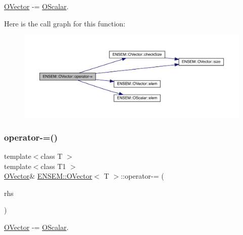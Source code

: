 \mbox{\hyperlink{classENSEM_1_1OVector}{O\+Vector}} -\/= \mbox{\hyperlink{classENSEM_1_1OScalar}{O\+Scalar}}. 

Here is the call graph for this function\+:
\nopagebreak
\begin{figure}[H]
\begin{center}
\leavevmode
\includegraphics[width=350pt]{d0/d8d/classENSEM_1_1OVector_ae2ae62360c5eb29827cb7e3d5556859f_cgraph}
\end{center}
\end{figure}
\mbox{\label{classENSEM_1_1OVector_ae2ae62360c5eb29827cb7e3d5556859f}} 
\subsubsection{\texorpdfstring{operator-\/=()}{operator-=()}\hspace{0.1cm}{\footnotesize\ttfamily [2/6]}}
{\footnotesize\ttfamily template$<$class T $>$ \\
template$<$class T1 $>$ \\
\mbox{\hyperlink{classENSEM_1_1OVector}{O\+Vector}}\& \mbox{\hyperlink{classENSEM_1_1OVector}{E\+N\+S\+E\+M\+::\+O\+Vector}}$<$ T $>$\+::operator-\/= (\begin{DoxyParamCaption}\item[{const \mbox{\hyperlink{classENSEM_1_1OScalar}{O\+Scalar}}$<$ T1 $>$ \&}]{rhs }\end{DoxyParamCaption})\hspace{0.3cm}{\ttfamily [inline]}}



\mbox{\hyperlink{classENSEM_1_1OVector}{O\+Vector}} -\/= \mbox{\hyperlink{classENSEM_1_1OScalar}{O\+Scalar}}. 

